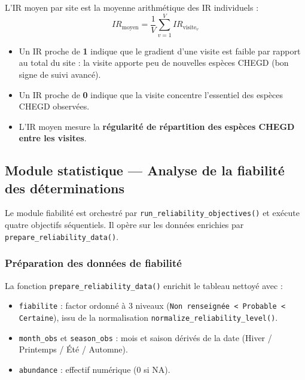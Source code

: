\documentclass[11pt,a4paper]{article}
\begin{document}
L'IR moyen par site est la moyenne arithmétique des IR individuels :
\[
  IR_{\text{moyen}} = \frac{1}{V}\sum_{v=1}^{V} IR_{\text{visite}_v}
\]

\begin{infobox}[Interprétation de l'IR]
  \begin{itemize}
    \item Un IR proche de \textbf{1} indique que le gradient d'une visite est faible par rapport au total du site : la visite apporte peu de nouvelles espèces CHEGD (bon signe de suivi avancé).
    \item Un IR proche de \textbf{0} indique que la visite concentre l'essentiel des espèces CHEGD observées.
    \item L'IR moyen mesure la \textbf{régularité de répartition des espèces CHEGD entre les visites}.
  \end{itemize}
\end{infobox}

\subsection{Module statistique — Analyse de la fiabilité des déterminations}

Le module fiabilité est orchestré par \texttt{run\_reliability\_objectives()} et
exécute quatre objectifs séquentiels. Il opère sur les données enrichies par
\texttt{prepare\_reliability\_data()}.

\subsubsection{Préparation des données de fiabilité}

La fonction \texttt{prepare\_reliability\_data()} enrichit le tableau nettoyé avec :

\begin{itemize}
  \item \texttt{fiabilite} : factor ordonné à 3 niveaux (\texttt{Non renseignée < Probable < Certaine}), issu de la normalisation \texttt{normalize\_reliability\_level()}.
  \item \texttt{month\_obs} et \texttt{season\_obs} : mois et saison dérivés de la date (Hiver / Printemps / Été / Automne).
  \item \texttt{abundance} : effectif numérique (0 si NA).
\end{itemize}
\end{document}
